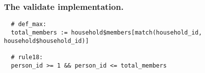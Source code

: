 \subsubsection*{The validate implementation.}
\begin{verbatim}
  # def_max:
  total_members := household$members[match(household_id, household$household_id)]

  # rule18:
  person_id >= 1 && person_id <= total_members
\end{verbatim}

